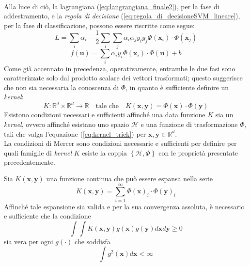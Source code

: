 \\
Alla luce di ciò, la lagrangiana (\ref{eq:langrangiana_finale2}), per la fase di addestramento, e la \emph{regola di decisione} (\ref{eq:regola_di_decisioneSVM_lineare}), per la fase di classificazione, possono essere riscritte come segue:
\begin{equation}
\label{eq:lagrangiana_con_funzione_di_trasformazione}
L=\sum_i\alpha_i-\dfrac{1}{2}\sum_i\sum_j\alpha_i\alpha_jy_iy_j\Phi(\mathbf{x}_i)\cdot\Phi(\mathbf{x}_j)
\end{equation}
\begin{equation}
\label{eq:regola_di_decisione_con_funzione_di_trasformazione}
f(\mathbf{u})=\sum_i\alpha_iy_i\Phi(\mathbf{x}_i)\cdot\Phi(\mathbf{u})+b
\end{equation}
Come già accennato in precedenza, operativamente, entrambe le due fasi sono caratterizzate solo dal prodotto scalare dei vettori trasformati; questo suggerisce che non sia necessaria la conoscenza di $\Phi$, in quanto è sufficiente definire un \emph{kernel}:
\begin{equation}
\label{eq:kernel_trick}
K:\mathbb{R}^d\times\mathbb{R}^d\rightarrow\mathbb{R}\quad\text{tale che}\quad K(\mathbf{x},\mathbf{y})=\Phi(\mathbf{x})\cdot\Phi(\mathbf{y})
\end{equation}
Esistono condizioni necessari e sufficienti affinché una data funzione $K$ sia un \emph{kernel}, ovvero affinché esistano uno spazio $\mathcal{H}$ e una funzione di trasformazione $\Phi$, tali che valga l'equazione (\ref{eq:kernel_trick}) per $\mathbf{x},\mathbf{y}\in\mathbb{R}^d$. \\
La condizioni di Mercer sono condizioni necessarie e sufficienti per definire per quali famiglie di \emph{kernel} $K$ esiste la coppia $\left\lbrace\mathcal{H},\Phi\right\rbrace$ con le proprietà presentate precedentemente.\\
\begin{teorema}
Sia $K(\mathbf{x},\mathbf{y})$ una funzione continua che può essere espansa nella serie
\begin{equation}
\label{eq:condizioni_di_Mercer1}
K(\mathbf{x},\mathbf{y})=\sum_{i=1}^\infty\Phi(\mathbf{x})_i\cdot\Phi(\mathbf{y})_i
\end{equation}
Affinché tale espansione sia valida e per la sua convergenza assoluta, è necessario e sufficiente che la condizione
\begin{equation}
\label{eq:condizioni_di_Mercer2}
\int\int K(\mathbf{x},\mathbf{y})g(\mathbf{x})g(\mathbf{y})d\mathbf{x}d\mathbf{y}\geq0
\end{equation}
sia vera per ogni $g(\cdot)$ che soddisfa
\begin{equation}
\label{eq:}
\int g^2(\mathbf{x})d\mathbf{x}<\infty
\end{equation}
\end{teorema}

